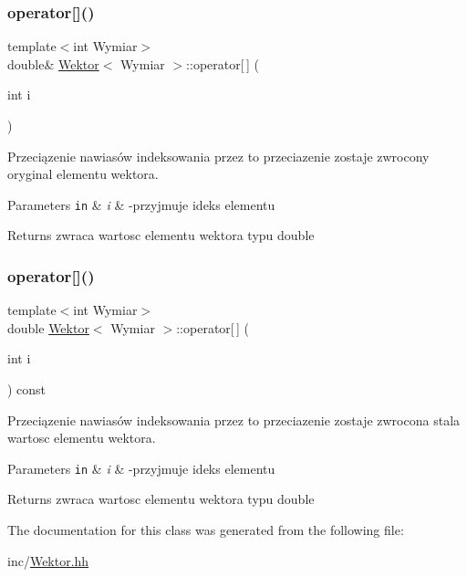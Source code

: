 \subsubsection{\texorpdfstring{operator[]()}{operator[]()}\hspace{0.1cm}{\footnotesize\ttfamily [1/2]}}
{\footnotesize\ttfamily template$<$int Wymiar$>$ \\
double\& \hyperlink{classWektor}{Wektor}$<$ Wymiar $>$\+::operator\mbox{[}$\,$\mbox{]} (\begin{DoxyParamCaption}\item[{int}]{i }\end{DoxyParamCaption})\hspace{0.3cm}{\ttfamily [inline]}}



Przeciązenie nawiasów indeksowania przez to przeciazenie zostaje zwrocony oryginal elementu wektora. 


\begin{DoxyParams}[1]{Parameters}
\mbox{\tt in}  & {\em i} & -\/przyjmuje ideks elementu \\
\hline
\end{DoxyParams}
\begin{DoxyReturn}{Returns}
zwraca wartosc elementu wektora typu double 
\end{DoxyReturn}
\mbox{\label{classWektor_a3db64cabd91749fd305e9c875804abda}} 
\subsubsection{\texorpdfstring{operator[]()}{operator[]()}\hspace{0.1cm}{\footnotesize\ttfamily [2/2]}}
{\footnotesize\ttfamily template$<$int Wymiar$>$ \\
double \hyperlink{classWektor}{Wektor}$<$ Wymiar $>$\+::operator\mbox{[}$\,$\mbox{]} (\begin{DoxyParamCaption}\item[{int}]{i }\end{DoxyParamCaption}) const\hspace{0.3cm}{\ttfamily [inline]}}



Przeciązenie nawiasów indeksowania przez to przeciazenie zostaje zwrocona stala wartosc elementu wektora. 


\begin{DoxyParams}[1]{Parameters}
\mbox{\tt in}  & {\em i} & -\/przyjmuje ideks elementu \\
\hline
\end{DoxyParams}
\begin{DoxyReturn}{Returns}
zwraca wartosc elementu wektora typu double 
\end{DoxyReturn}


The documentation for this class was generated from the following file\+:\begin{DoxyCompactItemize}
\item 
inc/\hyperlink{Wektor_8hh}{Wektor.\+hh}\end{DoxyCompactItemize}
